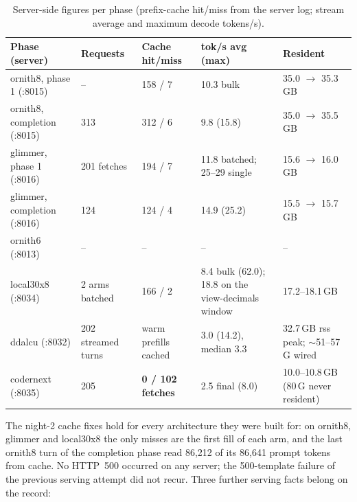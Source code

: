 \begin{table}[htbp]
\centering
\small
\caption{Server-side figures per phase (prefix-cache hit/miss from the server log; stream average and maximum
decode tokens/s).}\label{tab:serving3}
\footnotesize
\begin{tabular}{P{3.0cm}P{1.7cm}P{2.1cm}P{3.4cm}P{3.2cm}}
\toprule
Phase (server) & Requests & Cache hit/miss & tok/s avg (max) & Resident \\
\midrule
ornith8, phase 1 (:8015) & -- & 158 / 7 & 10.3 bulk & 35.0 $\rightarrow$ 35.3\,GB \\
ornith8, completion (:8015) & 313 & 312 / 6 & 9.8 (15.8) & 35.0 $\rightarrow$ 35.5\,GB \\
glimmer, phase 1 (:8016) & 201 fetches & 194 / 7 & 11.8 batched; 25--29 single & 15.6 $\rightarrow$ 16.0\,GB \\
glimmer, completion (:8016) & 124 & 124 / 4 & 14.9 (25.2) & 15.5 $\rightarrow$ 15.7\,GB \\
ornith6 (:8013) & -- & -- & -- & -- \\
local30x8 (:8034) & 2 arms batched & 166 / 2 & 8.4 bulk (62.0); 18.8 on the view-decimals window & 17.2--18.1\,GB \\
ddalcu (:8032) & 202 streamed turns & warm prefills cached & 3.0 (14.2), median 3.3 & 32.7\,GB rss peak; ${\sim}$51--57\,G wired \\
codernext (:8035) & 205 & \textbf{0 / 102 fetches} & 2.5 final (8.0) & 10.0--10.8\,GB (80\,G never resident) \\
\bottomrule
\end{tabular}
\end{table}

The night-2 cache fixes hold for every architecture they were built for: on ornith8, glimmer and local30x8 the
only misses are the first fill of each arm, and the last ornith8 turn of the completion phase read 86{,}212 of
its 86{,}641 prompt tokens from cache. No HTTP~500 occurred on any server; the 500-template failure of the
previous serving attempt did not recur. Three further serving facts belong on the record:

